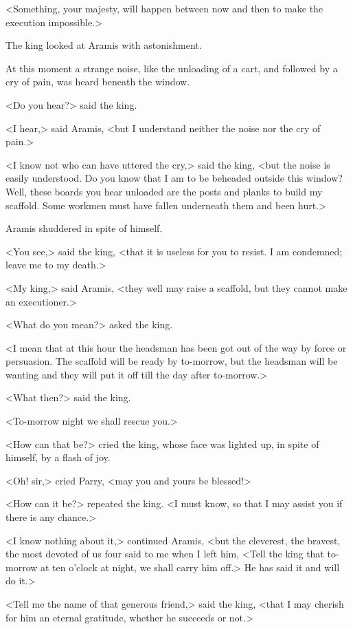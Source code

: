 <Something, your majesty, will happen between now and then to make the execution impossible.>

The king looked at Aramis with astonishment.

At this moment a strange noise, like the unloading of a cart, and followed by a cry of pain, was heard beneath the window.

<Do you hear?> said the king.

<I hear,> said Aramis, <but I understand neither the noise nor the cry of pain.>

<I know not who can have uttered the cry,> said the king, <but the noise is easily understood. Do you know that I am to be beheaded outside this window? Well, these boards you hear unloaded are the posts and planks to build my scaffold. Some workmen must have fallen underneath them and been hurt.>

Aramis shuddered in spite of himself.

<You see,> said the king, <that it is useless for you to resist. I am condemned; leave me to my death.>

<My king,> said Aramis, <they well may raise a scaffold, but they cannot make an executioner.>

<What do you mean?> asked the king.

<I mean that at this hour the headsman has been got out of the way by force or persuasion. The scaffold will be ready by to-morrow, but the headsman will be wanting and they will put it off till the day after to-morrow.>

<What then?> said the king.

<To-morrow night we shall rescue you.>

<How can that be?> cried the king, whose face was lighted up, in spite of himself, by a flash of joy.

<Oh! sir,> cried Parry, <may you and yours be blessed!>

<How can it be?> repeated the king. <I must know, so that I may assist you if there is any chance.>

<I know nothing about it,> continued Aramis, <but the cleverest, the bravest, the most devoted of us four said to me when I left him, <Tell the king that to-morrow at ten o'clock at night, we shall carry him off.> He has said it and will do it.>

<Tell me the name of that generous friend,> said the king, <that I may cherish for him an eternal gratitude, whether he succeeds or not.>

